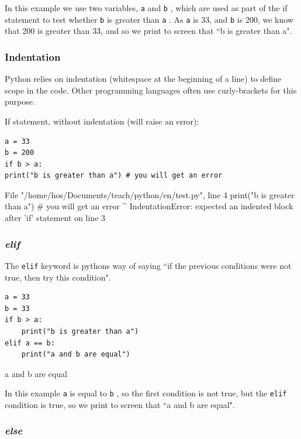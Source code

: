 \documentclass[12pt,a4paper]{article}
\newcommand{\code}[1]{%
	\colorbox{backcolour}{\lstinline{#1}}%
}
\begin{document}
In this example we use two variables, \code{a} and \code{b}, which are used
as part of the if statement to test whether \code{b} is greater than
\code{a}. As \code{a} is 33, and \code{b} is 200, we know that 200 is
greater than 33, and so we print to screen that ``b is greater than a".
\subsubsection{Indentation}

Python relies on indentation (whitespace at the beginning of a line) to define
scope in the code. Other programming languages often use curly-brackets for
this purpose.

\begin{abox}
If statement, without indentation (will raise an error):
	\begin{lstlisting}
a = 33
b = 200
if b > a:
print("b is greater than a") # you will get an error
	\end{lstlisting}
\tcblower
	\begin{vercode}
  File "/home/hos/Documents/teach/python/en/test.py", line 4
    print("b is greater than a") # you will get an error
    ^
IndentationError: expected an indented block after 'if' statement on
line 3
	\end{vercode}
\end{abox}
\subsubsection{\textit{elif}}

The \code{elif} keyword is pythons way of saying ``if the previous conditions
were not true, then try this condition".

\begin{ebox}
	\begin{lstlisting}
a = 33
b = 33
if b > a:
    print("b is greater than a")
elif a == b:
    print("a and b are equal")
	\end{lstlisting}
\tcblower
	\begin{vercode}
a and b are equal
	\end{vercode}
\end{ebox}

In this example \code{a} is equal to \code{b}, so the first condition is not
true, but the \code{elif} condition is true, so we print to screen that
``a and b are equal".
\subsubsection{\textit{else}}
\end{document}
